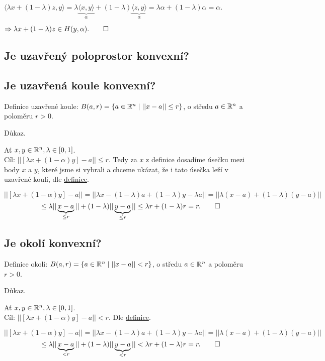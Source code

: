 $\langle \lambda x + (1-\lambda)z, y \rangle = \lambda \underbrace{\langle x,y \rangle}_{\alpha} + (1-\lambda) 
\underbrace{\langle z,y \rangle}_{\alpha} = \lambda \alpha + (1-\lambda) \alpha = \alpha$.

$\Rightarrow \lambda x + (1-\lambda)z \in H(y, \alpha). \qed$

\subsection{Je uzavřený poloprostor konvexní?}

\subsection{Je uzavřená koule konvexní?}
Definice uzavřené koule: $B(a,r) = \left\lbrace a \in \mathbb{R}^n \mid ||x -a || \leq r \right\rbrace$, o středu $a \in \mathbb{R}^n$ a poloměru $r > 0$. 

Důkaz.

Ať $x,y \in \mathbb{R}^n, \lambda \in [0,1]$.\\
Cíl: $|| [\lambda x + (1-\alpha)y] - a || \leq r$. Tedy za $x$ z definice dosadíme úsečku mezi body $x$ a $y$, které jsme
si vybrali a chceme ukázat, že i tato úsečka leží v uzavřené kouli, dle \hyperref[sec:konvex]{definice}.

\[
    || [\lambda x + (1-\alpha)y] - a || = || \lambda x - (1-\lambda)a + (1-\lambda)y - \lambda a || = 
    || \lambda (x-a) + (1-\lambda)(y-a) || 
\]
\[ 
    \leq \lambda ||\underbrace{x-a}_{\leq r}|| +  (1-\lambda)||\underbrace{y-a}_{\leq r}|| \leq \lambda r + (1-\lambda)r
     = r. \qed
\]

\subsection{Je okolí konvexní?}
Definice okolí: $B(a,r) = \left\lbrace a \in \mathbb{R}^n \mid ||x -a || < r \right\rbrace$, o středu $a \in \mathbb{R}^n$ a poloměru $r > 0$. 

Důkaz.

Ať $x,y \in \mathbb{R}^n, \lambda \in [0,1]$.\\
Cíl: $|| [\lambda x + (1-\alpha)y] - a || < r$. Dle \hyperref[sec:konvex]{definice}.

\[
    || [\lambda x + (1-\alpha)y] - a || = || \lambda x - (1-\lambda)a + (1-\lambda)y - \lambda a || = 
    || \lambda (x-a) + (1-\lambda)(y-a) || 
\]
\[ 
    \leq \lambda ||\underbrace{x-a}_{< r}|| +  (1-\lambda)||\underbrace{y-a}_{< r}|| < \lambda r + (1-\lambda)r
     = r. \qed
\]

